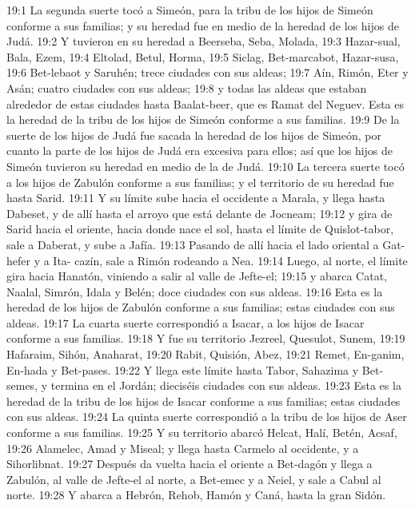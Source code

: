 19:1 La segunda suerte tocó a Simeón, para la tribu de los hijos de Simeón conforme a sus familias; y su heredad fue en medio de la heredad de los hijos de Judá.  
19:2 Y tuvieron en su heredad a Beerseba, Seba, Molada,  
19:3 Hazar-sual, Bala, Ezem,  
19:4 Eltolad, Betul, Horma,  
19:5 Siclag, Bet-marcabot, Hazar-susa,  
19:6 Bet-lebaot y Saruhén; trece ciudades con sus aldeas;  
19:7 Aín, Rimón, Eter y Asán; cuatro ciudades con sus aldeas;  
19:8 y todas las aldeas que estaban alrededor de estas ciudades hasta Baalat-beer, que es Ramat del Neguev. Esta es la heredad de la tribu de los hijos de Simeón conforme a sus familias. 
19:9 De la suerte de los hijos de Judá fue sacada la heredad de los hijos de Simeón, por cuanto la parte de los hijos de Judá era excesiva para ellos; así que los hijos de Simeón tuvieron su heredad en medio de la de Judá.  
19:10 La tercera suerte tocó a los hijos de Zabulón conforme a sus familias; y el territorio de su heredad fue hasta Sarid.  
19:11 Y su límite sube hacia el occidente a Marala, y llega hasta Dabeset, y de allí hasta el arroyo que está delante de Jocneam;  
19:12 y gira de Sarid hacia el oriente, hacia donde nace el sol, hasta el límite de Quislot-tabor, sale a Daberat, y sube a Jafía.  
19:13 Pasando de allí hacia el lado oriental a Gat-hefer y a Ita- cazín, sale a Rimón rodeando a Nea.  
19:14 Luego, al norte, el límite gira hacia Hanatón, viniendo a salir al valle de Jefte-el;  
19:15 y abarca Catat, Naalal, Simrón, Idala y Belén; doce ciudades con sus aldeas.  
19:16 Esta es la heredad de los hijos de Zabulón conforme a sus familias; estas ciudades con sus aldeas.  
19:17 La cuarta suerte correspondió a Isacar, a los hijos de Isacar conforme a sus familias.  
19:18 Y fue su territorio Jezreel, Quesulot, Sunem,  
19:19 Hafaraim, Sihón, Anaharat,  
19:20 Rabit, Quisión, Abez,  
19:21 Remet, En-ganim, En-hada y Bet-pases.  
19:22 Y llega este límite hasta Tabor, Sahazima y Bet-semes, y termina en el Jordán; dieciséis ciudades con sus aldeas.  
19:23 Esta es la heredad de la tribu de los hijos de Isacar conforme a sus familias; estas ciudades con sus aldeas.  
19:24 La quinta suerte correspondió a la tribu de los hijos de Aser conforme a sus familias.  
19:25 Y su territorio abarcó Helcat, Halí, Betén, Acsaf,  
19:26 Alamelec, Amad y Miseal; y llega hasta Carmelo al occidente, y a Sihorlibnat.  
19:27 Después da vuelta hacia el oriente a Bet-dagón y llega a Zabulón, al valle de Jefte-el al norte, a Bet-emec y a Neiel, y sale a Cabul al norte.  
19:28 Y abarca a Hebrón, Rehob, Hamón y Caná, hasta la gran Sidón.  
